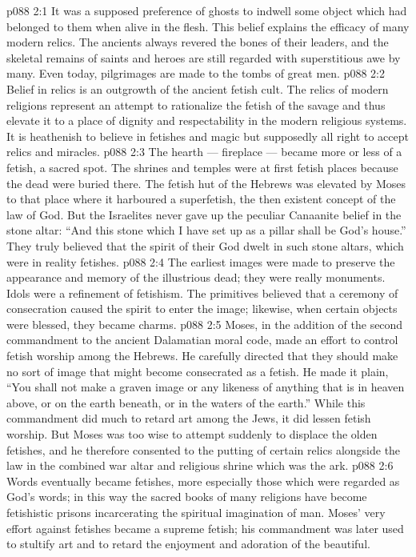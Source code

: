 \vs p088 2:1 It was a supposed preference of ghosts to indwell some object which had belonged to them when alive in the flesh. This belief explains the efficacy of many modern relics. The ancients always revered the bones of their leaders, and the skeletal remains of saints and heroes are still regarded with superstitious awe by many. Even today, pilgrimages are made to the tombs of great men.
\vs p088 2:2 Belief in relics is an outgrowth of the ancient fetish cult. The relics of modern religions represent an attempt to rationalize the fetish of the savage and thus elevate it to a place of dignity and respectability in the modern religious systems. It is heathenish to believe in fetishes and magic but supposedly all right to accept relics and miracles.
\vs p088 2:3 The hearth --- fireplace --- became more or less of a fetish, a sacred spot. The shrines and temples were at first fetish places because the dead were buried there. The fetish hut of the Hebrews was elevated by Moses to that place where it harboured a superfetish, the then existent concept of the law of God. But the Israelites never gave up the peculiar Canaanite belief in the stone altar: “And this stone which I have set up as a pillar shall be God’s house.” They truly believed that the spirit of their God dwelt in such stone altars, which were in reality fetishes.
\vs p088 2:4 \pc The earliest images were made to preserve the appearance and memory of the illustrious dead; they were really monuments. Idols were a refinement of fetishism. The primitives believed that a ceremony of consecration caused the spirit to enter the image; likewise, when certain objects were blessed, they became charms.
\vs p088 2:5 Moses, in the addition of the second commandment to the ancient Dalamatian moral code, made an effort to control fetish worship among the Hebrews. He carefully directed that they should make no sort of image that might become consecrated as a fetish. He made it plain, “You shall not make a graven image or any likeness of anything that is in heaven above, or on the earth beneath, or in the waters of the earth.” While this commandment did much to retard art among the Jews, it did lessen fetish worship. But Moses was too wise to attempt suddenly to displace the olden fetishes, and he therefore consented to the putting of certain relics alongside the law in the combined war altar and religious shrine which was the ark.
\vs p088 2:6 \pc Words eventually became fetishes, more especially those which were regarded as God’s words; in this way the sacred books of many religions have become fetishistic prisons incarcerating the spiritual imagination of man. Moses’ very effort against fetishes became a supreme fetish; his commandment was later used to stultify art and to retard the enjoyment and adoration of the beautiful.
